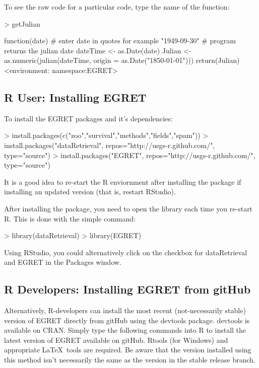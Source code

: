 \documentclass[a4paper,11pt]{article}
\begin{document}
To see the raw code for a particular code, type the name of the function:
\begin{Schunk}
\begin{Sinput}
> getJulian
\end{Sinput}
\begin{Soutput}
function(date) {
  # enter date in quotes for example "1949-09-30" 
  # program returns the julian date  
  dateTime <- as.Date(date)
  Julian <- as.numeric(julian(dateTime, origin = as.Date("1850-01-01")))
  return(Julian)
}
<environment: namespace:EGRET>
\end{Soutput}
\end{Schunk}


\subsection{R User: Installing EGRET}
To install the EGRET packages and it's dependencies:

\begin{Schunk}
\begin{Sinput}
> install.packages(c("zoo","survival","methods","fields","spam"))
> install.packages("dataRetrieval", repos="http://usgs-r.github.com/", 
                  type="source")
> install.packages("EGRET", repos="http://usgs-r.github.com/", 
                  type="source")
\end{Sinput}
\end{Schunk}

It is a good idea to re-start the R enviornment after installing the package if installing an updated version (that is, restart RStudio). 

After installing the package, you need to open the library each time you re-start R.  This is done with the simple command:
\begin{Schunk}
\begin{Sinput}
> library(dataRetrieval)
> library(EGRET)
\end{Sinput}
\end{Schunk}
Using RStudio, you could alternatively click on the checkbox for dataRetrieval and EGRET in the Packages window.

\subsection{R Developers: Installing EGRET from gitHub}
Alternatively, R-developers can install the most recent (not-necessarily stable) version of EGRET directly from gitHub using the devtools package.  devtools is available on CRAN.  Simply type the following commands into R to install the latest version of EGRET available on gitHub.  Rtools (for Windows) and appropriate \LaTeX\ tools are required. Be aware that the version installed using this method isn't necessarily the same as the version in the stable release branch.  
\end{document}
